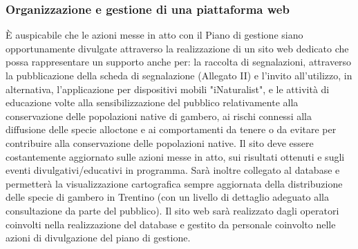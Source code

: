 \documentclass[11pt,a4paper,italian,twoside,openany]{memoir}
\begin{document}
\subsubsection{Organizzazione e gestione di una piattaforma web}
\label{subsub_web}
È auspicabile che le azioni messe in atto con il Piano di gestione siano opportunamente divulgate attraverso la realizzazione di un sito web dedicato che possa rappresentare un supporto anche per: la raccolta di segnalazioni, attraverso la pubblicazione della scheda di segnalazione (Allegato II) e l'invito all'utilizzo, in alternativa, l'applicazione per dispositivi mobili "iNaturalist", e le attività di educazione volte alla sensibilizzazione del pubblico relativamente alla conservazione delle popolazioni native di gambero, ai rischi connessi alla diffusione delle specie alloctone e ai comportamenti da tenere o da evitare per contribuire alla conservazione delle popolazioni native. Il sito deve essere costantemente aggiornato sulle azioni messe in atto, sui risultati ottenuti e sugli eventi divulgativi/educativi in programma. Sarà inoltre collegato al database e permetterà la visualizzazione cartografica sempre aggiornata della distribuzione delle specie di gambero in Trentino (con un livello di dettaglio adeguato alla consultazione da parte del pubblico). Il sito web sarà realizzato dagli operatori coinvolti nella realizzazione del database e gestito da personale coinvolto nelle azioni di divulgazione del piano di gestione. 
\end{document}
